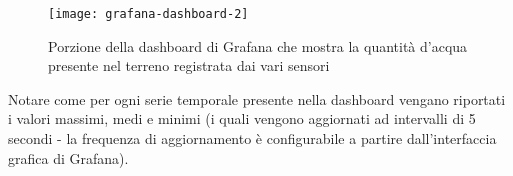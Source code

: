 \begin{figure}[ht]
\centering
\texttt{[image: grafana-dashboard-2]}
\caption{Porzione della dashboard di Grafana che mostra la quantità d'acqua presente nel terreno registrata dai vari sensori}
\label{fig:grafana-dashboard-2}
\end{figure}

Notare come per ogni serie temporale presente nella dashboard vengano riportati i valori massimi, medi e minimi (i quali vengono aggiornati ad intervalli di 5 secondi - la frequenza di aggiornamento è configurabile a partire dall'interfaccia grafica di Grafana).